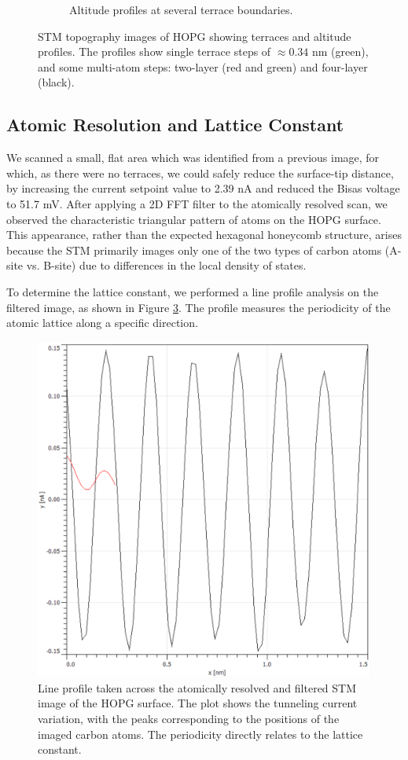 \documentclass[12pt,a4paper]{article}
\begin{document}
\begin{figure}[H]
\begin{subfigure}[b]{0.48\linewidth}
        \caption{Altitude profiles at several terrace boundaries.}
        \label{fig:altitude_profiles}
    \end{subfigure}
    \caption{STM topography images of HOPG showing terraces and altitude profiles. The profiles show single terrace steps of $\approx 0.34 \text{ nm}$ (green), and some multi-atom steps: two-layer (red and green) and four-layer (black).}
    \label{fig:terraces_and_profiles}
\end{figure}


\subsection{Atomic Resolution and Lattice Constant}


We scanned a small, flat area which was identified from a previous image, for which, as there were no terraces, we could safely reduce the surface-tip distance, by increasing the current setpoint value to 2.39 nA and reduced the Bisas voltage to 51.7 mV. After applying a 2D FFT filter to the atomically resolved scan, we observed the characteristic triangular pattern of atoms on the HOPG surface. This appearance, rather than the expected hexagonal honeycomb structure, arises because the STM primarily images only one of the two types of carbon atoms (A-site vs. B-site) due to differences in the local density of states.

To determine the lattice constant, we performed a line profile analysis on the filtered image, as shown in Figure \ref{fig:atomic-res}. The profile measures the periodicity of the atomic lattice along a specific direction.

\begin{figure}[H]
    \centering
    \includegraphics[width=0.8\linewidth]{../data/tasks/3/intermolecular_distance.PNG}
    \caption{Line profile taken across the atomically resolved and filtered STM image of the HOPG surface. The plot shows the tunneling current variation, with the peaks corresponding to the positions of the imaged carbon atoms. The periodicity directly relates to the lattice constant.}
    \label{fig:atomic-res}
\end{figure}
\end{document}
